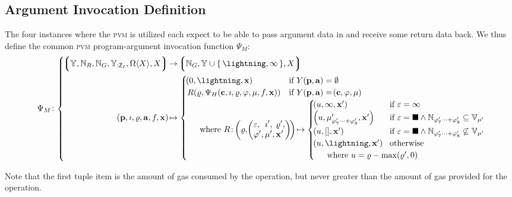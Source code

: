 \subsection{Argument Invocation Definition}

The four instances where the \textsc{pvm} is utilized each expect to be able to pass argument data in and receive some return data back. We thus define the common \textsc{pvm} program-argument invocation function $\Psi_M$:
\begin{equation}
  \Psi_M\colon \abracegroup{
    \tuple{
      \blob, \pvmreg, \gas, \blob[:\mathsf{Z}_I], \Omega\ang{X}, X
    } &\to \tuple{\gas, \blob \cup \set{\panic, \oog}, X}\\
    \tup{\mathbf{p}, \imath, \gascounter, \mathbf{a}, f, \mathbf{x}} &\mapsto \begin{cases}
      \tup{0, \panic, \mathbf{x}} &\when Y(\mathbf{p}, \mathbf{a}) = \none\\
      R(\gascounter, \Psi_H(\mathbf{c}, \imath, \gascounter, \registers, \mem, f, \mathbf{x})) &\when Y(\mathbf{p}, \mathbf{a}) = \tup{\mathbf{c}, \registers, \mem}\\
      \multicolumn{2}{l}{
        \quad \where R \colon \tup{\gascounter, \tup{\begin{alignedat}{5}
          &\varepsilon,\, &&\imath',\, &&\gascounter',\\
          &\registers',\, &&\mem',\, &&\mathbf{x}'
        \end{alignedat}
        }} \mapsto \begin{cases}
          \tup{u, \oog, \mathbf{x}'} &\when \varepsilon = \oog \\
          \tup{u, \memory'_{\registers'_{7}\dots+\registers'_{8}}, \mathbf{x}'} &\when \varepsilon = \halt \wedge \Nrange{\registers'_{7}}{\registers'_{8}} \subseteq \readable{\mem'} \\
          \tup{u, \sq{}, \mathbf{x}'} &\when \varepsilon = \halt \wedge \Nrange{\registers'_{7}}{\registers'_{8}} \not\subseteq \readable{\mem'} \\
          \tup{u, \panic, \mathbf{x}'} &\otherwise \\
          \multicolumn{2}{l}{\quad \where u = \gascounter - \max(\gascounter', 0)}
        \end{cases}
      }\!\!\!\!\!\!\!\!
    \end{cases}
  }
\end{equation}

Note that the first tuple item is the amount of gas consumed by the operation, but never greater than the amount of gas provided for the operation.

